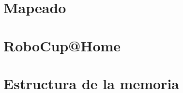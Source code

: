 \section{Mapeado}
\label{cap:mapeado}

\section{RoboCup@Home}
\label{cap:robocup}

\section{Estructura de la memoria}
\label{cap:estructuradelamemoria}


